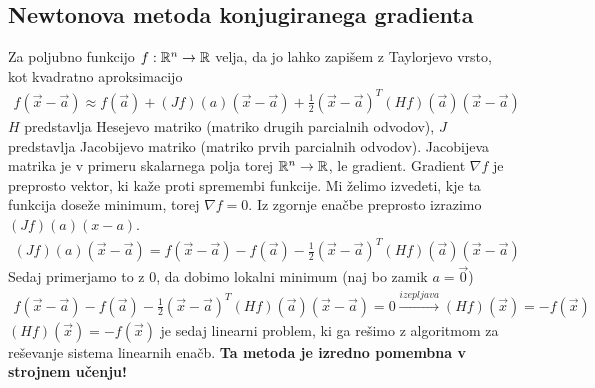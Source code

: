 \subsection{Newtonova metoda konjugiranega gradienta}
Za poljubno funkcijo $f: \mathbb{R}^n \to \mathbb{R}$ velja, da jo lahko zapišem z Taylorjevo vrsto, kot kvadratno aproksimacijo
\begin{align}
    f(\Vec{x} - \Vec{a}) \approx f(\Vec{a})  + (Jf)(a)(\Vec{x} - \Vec{a}) +  \frac{1}{2} (\Vec{x} - \Vec{a})^T (Hf)(\Vec{a}) (\Vec{x} - \Vec{a})
\end{align}
$H$ predstavlja Hesejevo matriko (matriko drugih parcialnih odvodov), $J$ predstavlja Jacobijevo matriko (matriko prvih parcialnih odvodov). Jacobijeva matrika je v primeru skalarnega polja torej $\mathbb{R}^n \to \mathbb{R}$, le gradient. Gradient $\nabla f$ je preprosto vektor, ki kaže proti spremembi funkcije. Mi želimo izvedeti, kje ta funkcija doseže minimum, torej $\nabla f = 0$. Iz zgornje enačbe preprosto izrazimo $(Jf)(a)(x-a)$.
\begin{align}
    (Jf)(a)(\Vec{x} - \Vec{a}) = f(\Vec{x} - \Vec{a}) - f(\Vec{a}) - \frac{1}{2} (\Vec{x} - \Vec{a})^T (Hf)(\Vec{a}) (\Vec{x} - \Vec{a})
\end{align}
Sedaj primerjamo to z 0, da dobimo lokalni minimum (naj bo zamik $a=\Vec{0}$)
\begin{align}
    f(\Vec{x} - \Vec{a}) - f(\Vec{a}) - \frac{1}{2} (\Vec{x} - \Vec{a})^T (Hf)(\Vec{a}) (\Vec{x} - \Vec{a}) = 0 \xrightarrow{izepljava} (Hf)(\vec{x}) = -f(\vec{x})\  
\end{align}
$(Hf)(\vec{x}) = -f(\vec{x})$ je sedaj linearni problem, ki ga rešimo z algoritmom za reševanje sistema linearnih enačb.
\textbf{Ta metoda je izredno pomembna v strojnem učenju!}